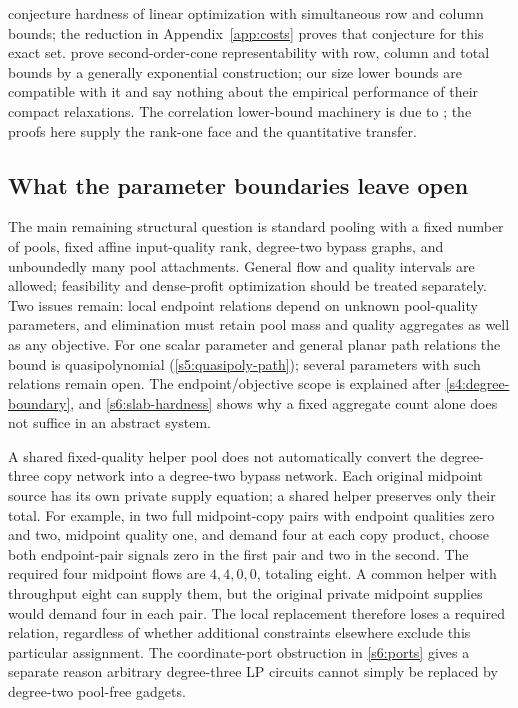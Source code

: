 \citet[Section~3.1, after Theorem~4]
{dey2020-convexifications-of-rank-one-based} conjecture hardness of linear
optimization with simultaneous row and column bounds; the reduction in
Appendix~\ref{app:costs} proves that conjecture for this exact set.
\citet[Theorem~2]{s6:jalilian2026} prove second-order-cone
representability with row, column and total bounds by a generally
exponential construction; our size lower bounds are compatible with it
and say nothing about the empirical performance of their compact
relaxations. The correlation lower-bound
machinery is due to \citet{s6:fawzi2013,s6:lrs-full,s6:bfps2015}; the
proofs here supply the rank-one face and the quantitative transfer.

\subsection{What the parameter boundaries leave open}\label{s6:open}
The main remaining structural question is standard pooling with a fixed
number of pools, fixed affine input-quality rank, degree-two bypass
graphs, and unboundedly many pool attachments. General flow and quality
intervals are allowed; feasibility and dense-profit optimization should
be treated separately. Two issues remain: local endpoint relations
depend on unknown pool-quality parameters, and elimination must retain
pool mass and quality aggregates as well as any objective. For one
scalar parameter and general planar path relations the bound is
quasipolynomial (\cref{s5:quasipoly-path}); several parameters with
such relations remain open. The endpoint/objective scope is explained after
\cref{s4:degree-boundary},
and \cref{s6:slab-hardness} shows why a fixed aggregate count alone
does not suffice in an abstract system.

A shared fixed-quality helper pool does not automatically convert the
degree-three copy network into a degree-two bypass network. Each original
midpoint source has its own private supply equation; a shared helper
preserves only their total. For example, in two full midpoint-copy
pairs with endpoint qualities zero and two, midpoint quality one,
and demand four at each copy product, choose both endpoint-pair signals
zero in the first pair and two in the second. The required four midpoint
flows are $4,4,0,0$, totaling eight. A common helper with throughput eight
can supply them, but the original private midpoint supplies would demand
four in each pair. The local replacement therefore loses a required
relation, regardless of whether additional constraints elsewhere exclude
this particular assignment. The coordinate-port obstruction in
\cref{s6:ports} gives a separate reason arbitrary degree-three LP circuits
cannot simply be replaced by degree-two pool-free gadgets.

